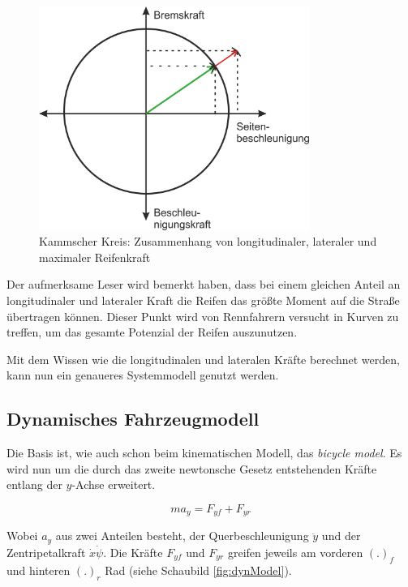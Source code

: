 \documentclass{like}
\begin{document}
\begin{figure}[ht!]
	\centering
	\includegraphics[width=250pt]{Abbildungen/kamKreis.png}
	\caption{Kammscher Kreis: Zusammenhang von longitudinaler, lateraler und maximaler Reifenkraft}
	\label{fig:kamKreis}
\end{figure}

Der aufmerksame Leser wird bemerkt haben, dass bei einem gleichen Anteil an longitudinaler und lateraler Kraft die Reifen das größte Moment auf die Straße übertragen können. Dieser Punkt wird von Rennfahrern versucht in Kurven zu treffen, um das gesamte Potenzial der Reifen auszunutzen.


Mit dem Wissen wie die longitudinalen und lateralen Kräfte berechnet werden, kann nun ein genaueres Systemmodell genutzt werden.

\subsection{Dynamisches Fahrzeugmodell}
\label{dynModel}

Die Basis ist, wie auch schon beim kinematischen Modell, das \textit{bicycle model}. Es wird nun um die durch das zweite newtonsche Gesetz entstehenden Kräfte entlang der \(y\)-Achse erweitert.

\begin{equation}
ma_y = F_{yf} + F_{yr}
\end{equation}   


Wobei \(a_y\) aus zwei Anteilen besteht, der Querbeschleunigung \(\ddot{y}\) und der Zentripetalkraft \(\dot{x} \dot{\psi}\).  
Die Kräfte \(F_{yf}\) und \(F_{yr}\) greifen jeweils am vorderen \((.)_f\) und hinteren \((.)_r\) Rad (siehe Schaubild \ref{fig:dynModel}). 
\end{document}
